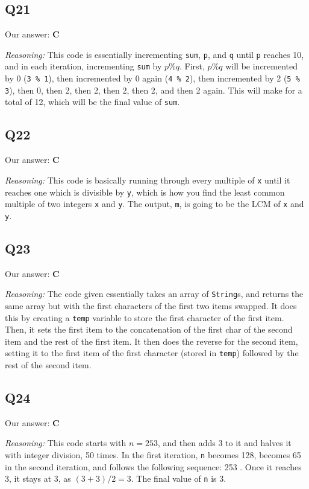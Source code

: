 \documentclass{article}
\begin{document}
\subsection{Q21}

Our answer: \textbf{C}

\noindent\textit{Reasoning:} This code is essentially incrementing \verb|sum|, \verb|p|, and \verb|q| until \verb|p| reaches 10, and in each iteration, incrementing \verb|sum| by \(p \% q\). First, \(p \% q\) will be incremented by 0 (\verb|3 % 1|), then incremented by 0 again (\verb|4 % 2|), then incremented by 2 (\verb|5 % 3|), then 0, then 2, then 2, then 2, then 2, and then 2 again. This will make for a total of 12, which will be the final value of \verb|sum|.

\subsection{Q22}

Our answer: \textbf{C}

\noindent\textit{Reasoning:} This code is basically running through every multiple of \verb|x| until it reaches one which is divisible by \verb|y|, which is how you find the least common multiple of two integers \verb|x| and \verb|y|. The output, \verb|m|, is going to be the LCM of \verb|x| and \verb|y|.

\subsection{Q23}

Our answer: \textbf{C}

\noindent\textit{Reasoning:} The code given essentially takes an array of \verb|String|s, and returns the same array but with the first characters of the first two items swapped. It does this by creating a \verb|temp| variable to store the first character of the first item. Then, it sets the first item to the concatenation of the first char of the second item and the rest of the first item. It then does the reverse for the second item, setting it to the first item of the first character (stored in \verb|temp|) followed by the rest of the second item.

\subsection{Q24}

Our answer: \textbf{C}

\noindent\textit{Reasoning:} This code starts with \(n = 253\), and then adds 3 to it and halves it with integer division, 50 times. In the first iteration, \verb|n| becomes 128, becomes 65 in the second iteration, and follows the following sequence: 253        . Once it reaches 3, it stays at 3, as \((3 + 3) / 2 = 3\). The final value of \verb|n| is 3.
\end{document}
